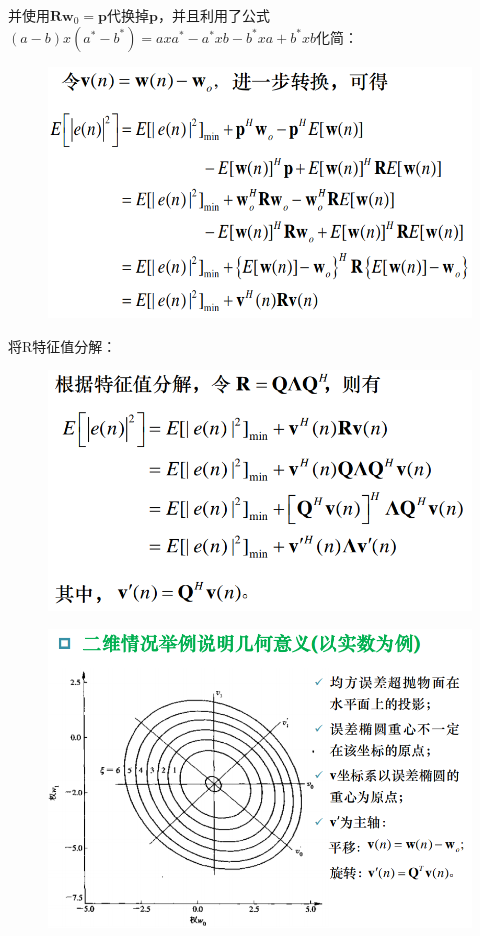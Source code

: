 \documentclass[UTF8]{ctexart} %
\begin{document}
			并使用$\bm{Rw}_0=\bm{p}$代换掉$\bm{p}$，并且利用了公式$(a-b)x(a^*-b^*) = axa^*-a^*xb-b^*xa+b^*xb$化简：
			\begin{figure}[H]
				\centering\includegraphics[scale=0.4]{42.png}
			\end{figure}
			将R特征值分解：
			\begin{figure}[H]
				\centering\includegraphics[scale=0.4]{43.png}
			\end{figure}
			\begin{figure}[H]
				\centering\includegraphics[scale=0.4]{44.png}
			\end{figure}
\end{document}
